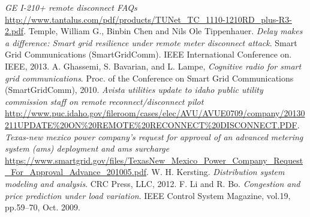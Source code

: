 \documentclass[11pt,oneside]{book}
\begin{document}
\begin{thebibliography}{99}
 \emph{GE I-210+ remote disconnect FAQs} \url{http://www.tantalus.com/pdf/products/TUNet_TC_1110-1210RD_plus-R3-2.pdf}.
 Temple, William G., Binbin Chen and Nils Ole Tippenhauer. \emph{Delay makes a difference: Smart grid resilience under remote meter disconnect attack}. Smart Grid Communications (SmartGridComm). IEEE International Conference on. IEEE, 2013.
 A. Ghassemi, S. Bavarian, and L. Lampe, \emph{Cognitive radio for smart grid communications}. Proc. of the Conference on Smart Grid Communications (SmartGridComm), 2010.
 \emph{Avista utilities update to idaho public utility commission staff on remote reconnect/disconnect pilot} \url{http://www.puc.idaho.gov/fileroom/cases/elec/AVU/AVUE0709/company/20130211UPDATE\%20ON\%20REMOTE\%20RECONNECT\%20DISCONNECT.PDF}.
 \emph{Texas-new mexico power company’s request for approval of an advanced metering system (ams) deployment and ams surcharge} \url{https://www.smartgrid.gov/files/TexasNew_Mexico_Power_Company_Request_For_Approval_Advance_201005.pdf}.
 W. H. Kersting. \emph{Distribution system modeling and analysis}. CRC Press, LLC, 2012.
 F. Li and R. Bo. \emph{Congestion and price prediction under load variation}. IEEE Control System Magazine, vol.19, pp.59–70, Oct. 2009.
\end{thebibliography}
\end{document}
